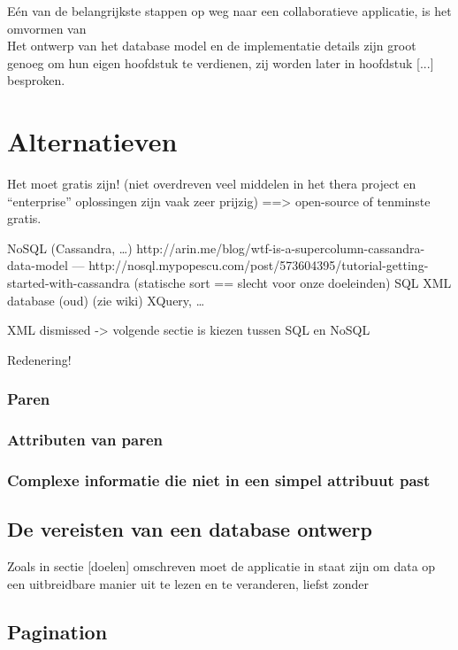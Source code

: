 E\'en van de belangrijkste stappen op weg naar een collaboratieve applicatie, is het omvormen van\\

Het ontwerp van het database model en de implementatie details zijn groot genoeg om hun eigen hoofdstuk te verdienen, zij worden later in hoofdstuk [...] besproken.\\

\section{Alternatieven}
Het moet gratis zijn! (niet overdreven veel middelen in het thera project en ``enterprise'' oplossingen zijn vaak zeer prijzig) ==> open-source of tenminste gratis.

NoSQL (Cassandra, \ldots) http://arin.me/blog/wtf-is-a-supercolumn-cassandra-data-model --- http://nosql.mypopescu.com/post/573604395/tutorial-getting-started-with-cassandra (statische sort == slecht voor onze doeleinden)
SQL
XML database (oud) (zie wiki) XQuery, \ldots

XML dismissed -> volgende sectie is kiezen tussen SQL en NoSQL

Redenering!

\subsubsection{Paren}

\subsubsection{Attributen van paren}

\subsubsection{Complexe informatie die niet in een simpel attribuut past}

\subsection{De vereisten van een database ontwerp}
Zoals in sectie [doelen] omschreven moet de applicatie in staat zijn om data op een uitbreidbare manier uit te lezen en te veranderen, liefst zonder 

\subsection{Pagination}

